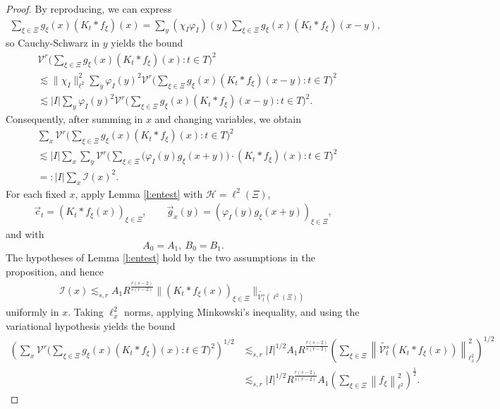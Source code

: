 \documentclass[12pt]{amsart}
\numberwithin{equation}{section}
\theoremstyle{definition}
\begin{document}
\begin{proof}
    By reproducing, we can express
    \begin{align}
        \sum_{\xi \in \Xi} g_\xi(x) (K_t*f_\xi)(x) = \sum_y (\chi_I \varphi_I)(y) \sum_{\xi \in \Xi} g_\xi(x) (K_t*f_\xi)(x-y),
    \end{align}
so Cauchy-Schwarz in $y$ yields the bound
\begin{align}
    &\mathcal{V}^r \big( \sum_{\xi \in \Xi} g_\xi(x) (K_t*f_\xi)(x) : t \in T \big)^2 \\
    & \lesssim \| \chi_I \|_{\ell^2}^2 \sum_y \varphi_I(y)^2 \mathcal{V}^r \big( \sum_{\xi \in \Xi} g_\xi(x) (K_t*f_\xi)(x-y) : t \in T \big)^2 \\
    & \lesssim |I| \sum_y \varphi_I(y)^2 \mathcal{V}^r \big( \sum_{\xi \in \Xi} g_\xi(x) (K_t*f_\xi)(x-y) : t \in T \big)^2.
\end{align}
Consequently, after summing in $x$ and changing variables, we obtain
\begin{align}
    &\sum_x \mathcal{V}^r \big( \sum_{\xi \in \Xi} g_\xi(x) (K_t*f_\xi)(x) : t \in T \big)^2 \\
    & \lesssim |I| \sum_x \sum_y  \mathcal{V}^r \big( \sum_{\xi \in \Xi} \big( \varphi_I(y) g_\xi(x+y) \big) \cdot (K_t*f_\xi)(x) : t \in T \big)^2 \\
    & =: |I| \sum_x \mathcal{I}(x)^2 .
\end{align}
For each fixed $x$, apply Lemma \ref{l:entest} with $\mathcal{H}=\ell^2(\Xi)$,
\begin{align}
    \vec{c}_t=(K_t*f_\xi(x))_{\xi\in\Xi},\qquad
    \vec{g}_x(y)=(\varphi_I(y)g_\xi(x+y))_{\xi\in\Xi},
\end{align}
and with 
\[ A_0=A_1, \ B_0=B_1.\]
The hypotheses of Lemma \ref{l:entest} hold by the two assumptions in the proposition, and hence
\begin{align}
    \mathcal{I}(x) \lesssim_{s,r}  A_1 R^{\frac{r(s-2)}{s(r-2)}}   \| (K_t*f_\xi(x))_{\xi\in\Xi} \|_{\widetilde{\mathcal{V}^s_t}(\ell^2(\Xi))}
\end{align}
uniformly in $x$. Taking $\ell^2_x$ norms, applying Minkowski's inequality, and using the variational hypothesis yields the bound
\[\begin{split}
    \left(\sum_x \mathcal{V}^r \big(\sum_{\xi \in \Xi} g_\xi(x) (K_t*f_\xi)(x) : t \in T\big)^2\right)^{1/2} 
&  \lesssim_{s,r} |I|^{1/2}  A_1 R^{\frac{r(s-2)}{s(r-2)}}\left(\sum_{\xi \in \Xi} \left \| \widetilde{\mathcal{V}_t^s}(K_t*f_{\xi}(x)) \right\|_{\ell_x^2}^2  \right)^{1/2}  \\ & \lesssim_{s,r} |I|^{1/2} R^{\frac{r(s-2)}{s(r-2)}} A_1 \left( \sum_{\xi \in \Xi} \left\| f_{\xi} \right\|_{\ell^2}^2 \right)^{\frac{1}{2}}.
\end{split}\]
\end{proof}
\end{document}

